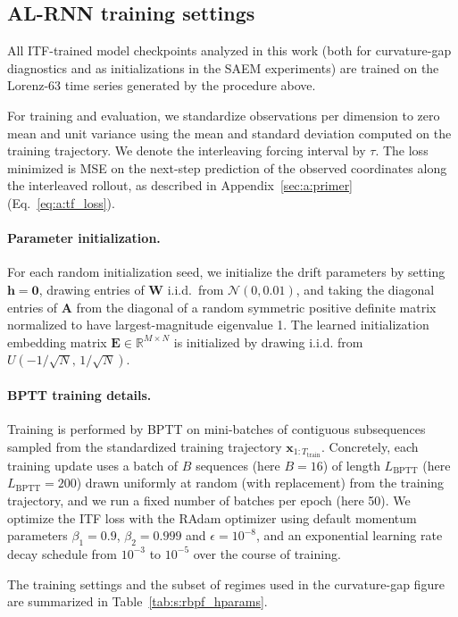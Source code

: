 \documentclass[twoside]{article}
\theoremstyle{plain}
\theoremstyle{definition}
\theoremstyle{remark}
\begin{document}
\subsection{AL-RNN training settings}
All ITF-trained model checkpoints analyzed in this work (both for curvature-gap diagnostics and as initializations in the SAEM experiments) are trained on the Lorenz-63 time series generated by the procedure above. 

For training and evaluation, we standardize observations per dimension to zero mean and unit variance using the mean and standard deviation computed on the training trajectory. We denote the interleaving forcing interval by $\tau$. The loss minimized is MSE on the next-step prediction of the observed coordinates along the interleaved rollout, as described in Appendix~\ref{sec:a:primer} (Eq.~\eqref{eq:a:tf_loss}).

\paragraph{Parameter initialization.}
For each random initialization seed, we initialize the drift parameters by setting $\bm h=\bm 0$, drawing entries of $\bm W$ i.i.d.\ from $\mathcal N(0,0.01)$, and taking the diagonal entries of $\bm A$ from the diagonal of a random symmetric positive definite matrix normalized to have largest-magnitude eigenvalue 1.
The learned initialization embedding matrix $\bm E\in\mathbb R^{M\times N}$ is initialized by drawing i.i.d. from $U(-1/\sqrt{N},\,1/\sqrt{N})$. 

\paragraph{BPTT training details.}
Training is performed by BPTT on mini-batches of contiguous subsequences sampled from the standardized training trajectory $\bm x_{1:T_{\mathrm{train}}}$. Concretely, each training update uses a batch of $B$ sequences (here $B=16$) of length $L_{\mathrm{BPTT}}$ (here $L_{\mathrm{BPTT}}=200$) drawn uniformly at random (with replacement) from the training trajectory, and we run a fixed number of batches per epoch (here 50).
We optimize the ITF loss with the RAdam optimizer \citep{liu2020radam} using default momentum parameters $\beta_1=0.9$, $\beta_2=0.999$ and $\epsilon=10^{-8}$, and an exponential learning rate decay schedule from $10^{-3}$ to $10^{-5}$ over the course of training. 

The training settings and the subset of regimes used in the curvature-gap figure are summarized in Table~\ref{tab:s:rbpf_hparams}.
\end{document}
